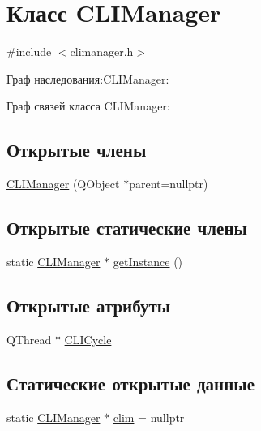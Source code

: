 \hypertarget{class_c_l_i_manager}{}\section{Класс C\+L\+I\+Manager}
\label{class_c_l_i_manager}


{\ttfamily \#include $<$climanager.\+h$>$}



Граф наследования\+:C\+L\+I\+Manager\+:


Граф связей класса C\+L\+I\+Manager\+:
\subsection*{Открытые члены}
\begin{DoxyCompactItemize}
\item 
\hyperlink{class_c_l_i_manager_aa6a57394f40679877ef36f4e8fbcd2bf}{C\+L\+I\+Manager} (Q\+Object $\ast$parent=nullptr)
\end{DoxyCompactItemize}
\subsection*{Открытые статические члены}
\begin{DoxyCompactItemize}
\item 
static \hyperlink{class_c_l_i_manager}{C\+L\+I\+Manager} $\ast$ \hyperlink{class_c_l_i_manager_a30fd449e0fea9cf14f56bf1ae17934ce}{get\+Instance} ()
\end{DoxyCompactItemize}
\subsection*{Открытые атрибуты}
\begin{DoxyCompactItemize}
\item 
Q\+Thread $\ast$ \hyperlink{class_c_l_i_manager_a38a670e14413ab95cf6bb1a7e80696c0}{C\+L\+I\+Cycle}
\end{DoxyCompactItemize}
\subsection*{Статические открытые данные}
\begin{DoxyCompactItemize}
\item 
static \hyperlink{class_c_l_i_manager}{C\+L\+I\+Manager} $\ast$ \hyperlink{class_c_l_i_manager_a9f8d1e3fca086f03d5ee5ea6d89287ab}{clim} = nullptr
\end{DoxyCompactItemize}


